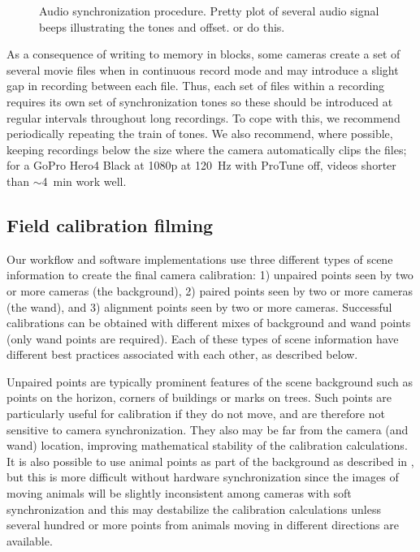 \documentclass[fleqn,10pt]{wlpeerj}
\begin{document}
\begin{figure}
\caption{Audio synchronization procedure.  Pretty plot of several audio signal beeps illustrating the tones and offset.  or  do this.} 
\label{fig:audiosync}
\end{figure}

As a consequence of writing to memory in blocks, some cameras create a set of several movie files when in continuous record mode and may introduce a slight gap in recording between each file. Thus, each set of files within a recording requires its own set of synchronization tones so these should be introduced at regular intervals throughout long recordings.  To cope with this, we recommend periodically repeating the train of tones.  We also recommend, where possible, keeping recordings below the size where the camera automatically clips the files; for a GoPro Hero4 Black at 1080p at \SI{120}{\hertz} with ProTune off, videos shorter than $\sim$\SI{4}{\minute} work well.




 

\subsection*{Field calibration filming}
Our workflow and software implementations use three different types of scene information to create the final camera calibration: 1) unpaired points seen by two or more cameras (the background), 2) paired points seen by two or more cameras (the wand), and 3) alignment points seen by two or more cameras. Successful calibrations can be obtained with different mixes of background and wand points (only wand points are required). Each of these types of scene information have different best practices associated with each other, as described below.

Unpaired points are typically prominent features of the scene background such as points on the horizon, corners of buildings or marks on trees. Such points are particularly useful for calibration if they do not move, and are therefore not sensitive to camera synchronization.  They also may be far from the camera (and wand) location, improving mathematical stability of the calibration calculations. It is also possible to use animal points as part of the background as described in \citep{Theriault:2014}, but this is more difficult without hardware synchronization since the images of moving animals will be slightly inconsistent among cameras with soft synchronization and this may destabilize the calibration calculations unless several hundred or more points from animals moving in different directions are available.
\end{document}
